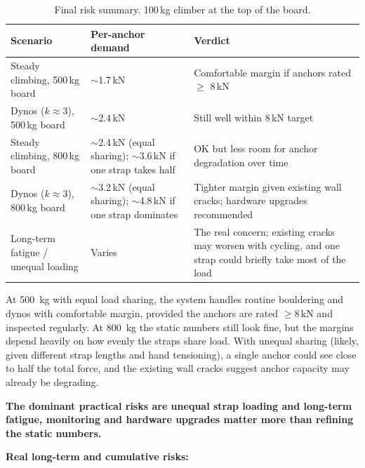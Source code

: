 \documentclass[12pt]{article}
\begin{document}
\begin{table}[h]
\centering
\begin{tabular}{l p{3.5cm} p{6.5cm}}
\hline
\textbf{Scenario} & \textbf{Per-anchor demand} & \textbf{Verdict} \\
\hline
Steady climbing, 500\,kg board & $\sim$1.7\,kN & Comfortable margin if anchors rated $\geq$ 8\,kN \\
Dynos ($k \approx 3$), 500\,kg board & $\sim$2.4\,kN & Still well within 8\,kN target \\
Steady climbing, 800\,kg board & $\sim$2.4\,kN (equal sharing); $\sim$3.6\,kN if one strap takes half & OK but less room for anchor degradation over time \\
Dynos ($k \approx 3$), 800\,kg board & $\sim$3.2\,kN (equal sharing); $\sim$4.8\,kN if one strap dominates & Tighter margin given existing wall cracks; hardware upgrades recommended \\
Long-term fatigue / unequal loading & Varies & The real concern; existing cracks may worsen with cycling, and one strap could briefly take most of the load \\
\hline
\end{tabular}
\caption{Final risk summary. 100\,kg climber at the top of the board.}
\label{tab:risk}
\end{table}

At 500~kg with equal load sharing, the system handles routine bouldering and dynos with comfortable margin, provided the anchors are rated $\geq 8\,\text{kN}$ and inspected regularly. At 800~kg the static numbers still look fine, but the margins depend heavily on how evenly the straps share load. With unequal sharing (likely, given different strap lengths and hand tensioning), a single anchor could see close to half the total force, and the existing wall cracks suggest anchor capacity may already be degrading.

\vspace{1em}
\textbf{The dominant practical risks are unequal strap loading and long-term fatigue, monitoring and hardware upgrades matter more than refining the static numbers.}

\vspace{0.5em}
\textbf{Real long-term and cumulative risks:}
\end{document}
